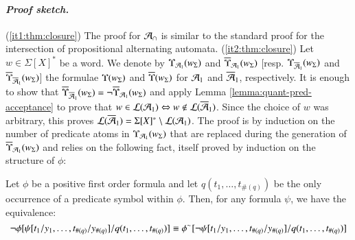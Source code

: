 \paragraph{\em Proof sketch.} (\ref{it1:thm:closure})
The proof for $\mathcal{A}_\cap$ is similar to the standard proof for the
intersection of propositional alternating
automata. (\ref{it2:thm:closure}) Let $w \in \Sigma[X]^*$ be a
word. We denote by $\Upsilon_{\mathcal{A}_1}({{w}_\Sigma})$ and
$\overline{\Upsilon}_{\mathcal{A}_1}({{w}_\Sigma})$
[resp. $\Upsilon_{\overline{\mathcal{A}}_1}({{w}_\Sigma})$ and
  $\overline{\Upsilon}_{\overline{\mathcal{A}}_1}({{w}_\Sigma})$] the formulae
$\Upsilon({{w}_\Sigma})$ and $\overline{\Upsilon}({{w}_\Sigma})$ for $\mathcal{A}_1$ and
$\overline{\mathcal{A}}_1$, respectively. It is enough to show that
$\overline{\Upsilon}_{\overline{\mathcal{A}}_1}({{w}_\Sigma}) =
\neg\overline{\Upsilon}_{\mathcal{A}_1}({{w}_\Sigma})$ and apply Lemma
\ref{lemma:quant-pred-acceptance} to prove that $w \in {\mathcal L}({\mathcal{A}_1})
\Leftrightarrow w \not\in {\mathcal L}({\overline{\mathcal{A}}_1})$. Since the choice of $w$ was
arbitrary, this proves ${\mathcal L}({\overline{\mathcal{A}}_1}) = \Sigma[X]^* \setminus
{\mathcal L}({\mathcal{A}_1})$. The proof is by induction on the number of predicate
atoms in $\Upsilon_{\mathcal{A}_1}({{w}_\Sigma})$ that are replaced during the
generation of $\overline{\Upsilon}_{\mathcal{A}_1}({{w}_\Sigma})$ and relies on the
following fact, itself proved by induction on the structure of $\phi$:
  \begin{fact}\label{fact:dual-neg}
    Let $\phi$ be a positive first order formula and let
    $q(t_1,\ldots,t_{\#(q)})$ be the only occurrence of a predicate
    symbol within $\phi$. Then, for any formula $\psi$, we have the
    equivalence:
    \[\neg\phi[\psi[t_1/y_1,\ldots,t_{\#(q)}/y_{\#(q)}]/q(t_1,\ldots,t_{\#(q)})]
    \equiv
    {\phi}^{\sim}[\neg\psi[t_1/y_1,\ldots,t_{\#(q)}/y_{\#(q)}]/q(t_1,\ldots,t_{\#(q)})]\]
  \end{fact}
\fi

